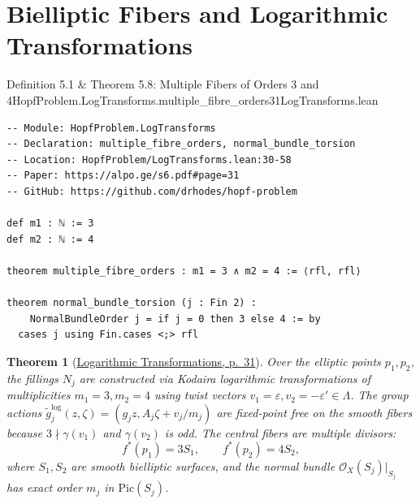 \documentclass[10pt]{article}
\newtheorem{theorem}{Theorem}[section]
\newcommand{\cO}{\mathcal{O}}
\newcommand{\Pic}{\mathrm{Pic}}
\gdef\hashchar{#}
\newcommand{\paperref}[2]{\href{https://alpo.ge/s6.pdf\hashchar page=#1}{#2}}
\begin{document}
\newpage

\section{Bielliptic Fibers and Logarithmic Transformations}

\begin{comparativeblock}{Definition 5.1 \& Theorem 5.8: Multiple Fibers of Orders 3 and 4}{HopfProblem.LogTransforms.multiple_fibre_orders}{31}{LogTransforms.lean}
\begin{verbatim}
-- Module: HopfProblem.LogTransforms
-- Declaration: multiple_fibre_orders, normal_bundle_torsion
-- Location: HopfProblem/LogTransforms.lean:30-58
-- Paper: https://alpo.ge/s6.pdf#page=31
-- GitHub: https://github.com/drhodes/hopf-problem

def m1 : ℕ := 3
def m2 : ℕ := 4

theorem multiple_fibre_orders : m1 = 3 ∧ m2 = 4 := ⟨rfl, rfl⟩

theorem normal_bundle_torsion (j : Fin 2) :
    NormalBundleOrder j = if j = 0 then 3 else 4 := by
  cases j using Fin.cases <;> rfl
\end{verbatim}
\tcblower
\begin{theorem}[\paperref{31}{Logarithmic Transformations, p.~31}]\label{thm:log-transforms}
Over the elliptic points $p_1, p_2$, the fillings $N_j$ are constructed via Kodaira logarithmic transformations of multiplicities $m_1 = 3, m_2 = 4$ using twist vectors $v_1 = \varepsilon, v_2 = -\varepsilon' \in \Lambda$.
The group actions $\tilde g_j^{\log}(z, \zeta) = (g_j z, A_j \zeta + v_j/m_j)$ are fixed-point free on the smooth fibers because $3 \nmid \gamma(v_1)$ and $\gamma(v_2)$ is odd.
The central fibers are multiple divisors:
\[
f^*(p_1) = 3S_1, \qquad f^*(p_2) = 4S_2,
\]
where $S_1, S_2$ are smooth bielliptic surfaces, and the normal bundle $\cO_X(S_j)|_{S_j}$ has exact order $m_j$ in $\Pic(S_j)$.
\end{theorem}
\end{comparativeblock}

\newpage

\end{document}
